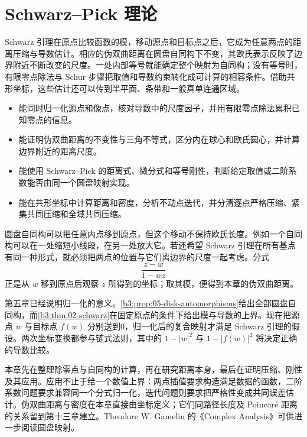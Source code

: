 \chapter{Schwarz–Pick 理论}
\label{b3:ch:06}
\begin{chapterabstract}
Schwarz 引理在原点比较函数的模，移动源点和目标点之后，它成为任意两点的距离压缩与导数估计。相应的伪双曲距离在圆盘自同构下不变，其欧氏表示反映了边界附近不断改变的尺度。一处内部等号就能确定整个映射为自同构；没有等号时，有限零点除法与 Schur 步骤把取值和导数约束转化成可计算的相容条件。借助共形坐标，这些估计还可以传到半平面、条带和一般真单连通区域。
\end{chapterabstract}

\begin{learninggoals}
\begin{itemize}
\item\label{b3:item:06-goal-1}能同时归一化源点和像点，核对导数中的尺度因子，并用有限零点除法累积已知零点的信息。
\item\label{b3:item:06-goal-2}能证明伪双曲距离的不变性与三角不等式，区分内在球心和欧氏圆心，并计算边界附近的距离尺度。
\item\label{b3:item:06-goal-3}能使用 Schwarz--Pick 的距离式、微分式和等号刚性，判断给定取值或二阶系数能否由同一个圆盘映射实现。
\item\label{b3:item:06-goal-4}能在共形坐标中计算距离和密度，分析不动点迭代，并分清逐点严格压缩、紧集共同压缩和全域共同压缩。
\end{itemize}
\end{learninggoals}

圆盘自同构可以把任意内点移到原点，但这个移动不保持欧氏长度。例如一个自同构可以在一处缩短小线段，在另一处放大它。若还希望 Schwarz 引理在所有基点有同一种形式，就必须把两点的位置与它们离边界的尺度一起考虑。分式
\[
 \frac{z-w}{1-\overline w z}
\]
正是从 \(w\) 移到原点后观察 \(z\) 所得到的坐标；取其模，便得到本章的伪双曲距离。

\ProseParagraphBreak

第五章已经说明归一化的意义。\cref{b3:prop:05-disk-automorphisms}给出全部圆盘自同构，而\cref{b3:thm:02-schwarz}在固定原点的条件下给出模与导数的上界。现在把源点 \(w\) 与目标点 \(f(w)\) 分别送到0，归一化后的复合映射才满足 Schwarz 引理的假设。两次坐标变换都参与链式法则，其中的 \(1-|w|^2\) 与 \(1-|f(w)|^2\) 将决定正确的导数比较。

\ProseParagraphBreak

本章先在整理除零点与自同构的计算，再在研究距离本身，最后在证明压缩、刚性及其应用。应用不止于给一个数值上界：两点插值要求构造满足数据的函数，二阶系数问题要求兼容同一个分式归一化，迭代问题则要求把严格性变成共同误差估计。伪双曲距离与密度在本章直接由坐标定义；它们同路径长度及 Poincaré 距离的关系留到第十三章建立。Theodore W. Gamelin 的《Complex Analysis》\cite{Gamelin2001Complex}可供进一步阅读圆盘映射。

